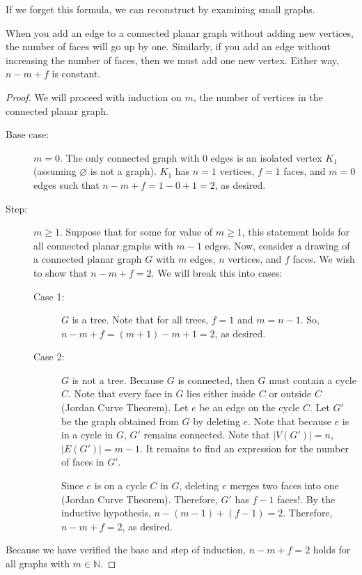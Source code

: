 
\begin{note}
	If we forget this formula, we can reconstruct by examining small graphs.
\end{note}

\begin{intuition}
	When you add an edge to a connected planar graph without adding new vertices, the number of faces will go up by one. Similarly, if you add an edge without increasing the number of faces, then we must add one new vertex. Either way, \( n-m+f \) is constant.
\end{intuition}

\begin{proof}
	We will proceed with induction on \( m \), the number of vertices in the connected planar graph.
	\begin{description}
		\item[Base case:] \( m=0 \). The only connected graph with 0 edges is an isolated vertex \( K_1 \) (assuming \( \varnothing \) is not a graph). \( K_1 \) has \( n = 1 \) vertices, \( f=1 \) faces, and \( m=0 \) edges such that \( n-m+f = 1-0+1 = 2 \), as desired.
		\item[Step:] \( m\ge 1\). Suppose that for some for value of \( m\ge 1 \), this statement holds for all connected planar graphs with \( m-1 \) edges. Now, consider a drawing of a connected planar graph \( G \) with \( m \) edges, \( n \) vertices, and \( f \) faces. We wish to show that \( n-m+f=2 \). We will break this into cases: \par
			\begin{description}
				\item[Case 1:] \( G \) is a tree. Note that for all trees, \( f = 1 \) and \( m = n - 1 \). So, \( n-m+f=(m+1)-m+1=2 \), as desired.
				\item[Case 2:] \( G \) is not a tree. Because \( G \) is connected, then \( G \) must contain a cycle \( C \). Note that every face in \( G \) lies either inside \( C \) or outside \( C \) (Jordan Curve Theorem). Let \( e \) be an edge on the cycle \( C \). Let \( G' \) be the graph obtained from \( G \) by deleting \( e \). Note that because \( e \) is in a cycle in \( G \), \( G' \) remains connected. Note that \( |V(G')| = n \), \( |E(G')|=m-1 \). It remains to find an expression for the number of faces in \( G' \). \par
					Since \( e \) is on a cycle \( C \) in \( G \), deleting \( e \) merges two faces into one (Jordan Curve Theorem). Therefore, \( G' \) has \( f-1 \) faces!. By the inductive hypothesis, \( n-(m-1)+(f-1)=2 \). Therefore, \( n-m+f=2 \), as desired.
			\end{description}
	\end{description}
	Because we have verified the base and step of induction, \( n-m+f=2 \) holds for all graphs with \( m \in \mathbb{N} \).
\end{proof}

